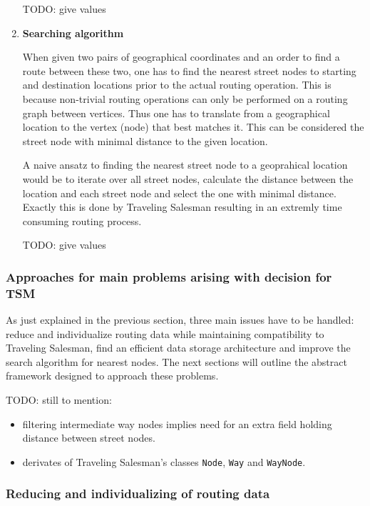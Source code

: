 \begin{enumerate}
		TODO: give values
											
	\item \textbf{Searching algorithm}
	
		When given two pairs of geographical coordinates and an order to find a route between these two, one has to find the nearest street nodes to starting and destination locations prior to the actual routing operation. This is because non-trivial routing operations can only be performed on a routing graph between vertices. Thus one has to translate from a geographical location to the vertex (node) that best matches it. This can be considered the street node with minimal distance to the given location.\newline
				
		A naive ansatz to finding the nearest street node 	to a geoprahical location would be to iterate over all street nodes, calculate the distance between the location and each street node and select the one with minimal distance. Exactly this is done by Traveling Salesman resulting in an extremly time consuming routing process.\newline
		
		TODO: give values

\end{enumerate}


\subsubsection{Approaches for main problems arising with decision for TSM}

As just explained in the previous section, three main issues have to be handled: reduce and individualize routing data while maintaining compatibility to Traveling Salesman, find an efficient data storage architecture and improve the search algorithm for nearest nodes. The next sections will outline the abstract framework designed to approach these problems.\newline

TODO: still to mention:
\begin{itemize}
	\item filtering intermediate way nodes implies need for an extra field holding distance between street nodes.
	\item derivates of Traveling Salesman's classes \texttt{Node}, \texttt{Way} and \texttt{WayNode}.
\end{itemize}

\subsubsection{Reducing and individualizing of routing data}

